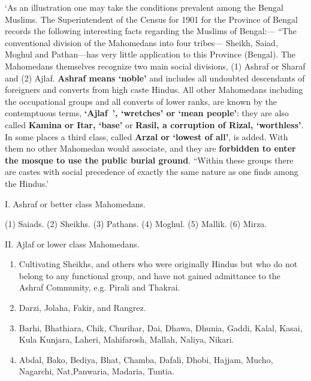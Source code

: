 \begin{myquote}
‘As an illustration one may take the conditions prevalent among the Bengal Muslims. The Superintendent of the Census for 1901 for the Province of Bengal records the following interesting facts regarding the Muslims of Bengal:— “The conventional division of the Mahomedans into four tribes— Sheikh, Saiad, Moghul and Pathan—has very little application to this Province (Bengal). The Mahomedans themselves recognize two main social divisions, (1) Ashraf or Sharaf and (2) Ajlaf. \textbf{Ashraf means `noble'} and includes all undoubted descendants of foreigners and converts from high caste Hindus. All other Mahomedans including the occupational groups and all converts of lower ranks, are known by the contemptuous terms, \textbf{`Ajlaf~', `wretches' or `mean people'}: they are also called \textbf{Kamina or Itar, `base'} or \textbf{Rasil, a corruption of Rizal, `worthless'}. In some places a third class, called \textbf{Arzal or `lowest of all'}, is added. With them no other Mahomedan would associate, and they are \textbf{forbidden to enter the mosque to use the public burial ground}. “Within these groups there are castes with social precedence of exactly the same nature as one finds among the Hindus.'
\end{myquote}

I. Ashraf or better class Mahomedans.

(1) Saiads. (2) Sheikhs. (3) Pathans. (4) Moghul. (5) Mallik. (6) Mirza.

II. Ajlaf or lower class Mahomedans.

\begin{enumerate}
\itemsep=0pt
\item Cultivating Sheikhs, and others who were originally Hindus but who do not belong to any functional group, and have not gained admittance to the Ashraf Community, e.g. Pirali and Thakrai.

 \item Darzi, Jolaha, Fakir, and Rangrez.

 \item Barhi, Bhathiara, Chik, Churihar, Dai, Dhawa, Dhunia, Gaddi, Kalal, Kasai, Kula Kunjara, Laheri, Mahifarosh, Mallah, Naliya, Nikari.

 \item Abdal, Bako, Bediya, Bhat, Chamba, Dafali, Dhobi, Hajjam, Mucho, Nagarchi, Nat,Panwaria, Madaria, Tuntia.

\end{enumerate}

